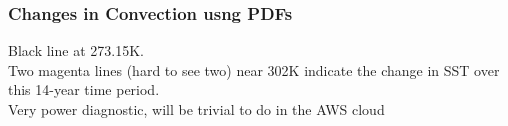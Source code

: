 \documentclass[10pt,t]{beamer}
\begin{document}
\begin{frame}
  \frametitle{Changes in Convection usng PDFs}

  \vspace{-0.4in}

  \begin{figure}
  \hspace*{0.2in}
\end{figure}

Black line at 273.15K.\\
\vspace{0.1in}Two magenta lines (hard to see two) near 302K indicate the
change in SST over this 14-year time period.\\
\vspace{0.1in} Very power diagnostic, will be trivial to do in the AWS cloud


\end{frame}
\end{document}
